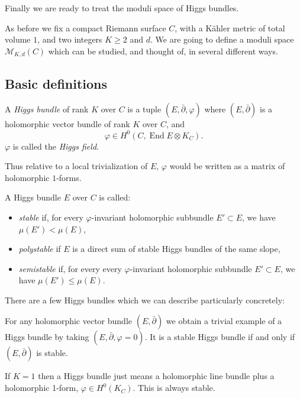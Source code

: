 \documentclass[12pt,letterpaper,reqno]{article}
\numberwithin{equation}{section}
\newcommand{\cM}{\ensuremath{\mathcal M}}
\newcommand{\kahler}{K\"ahler\xspace}
\newcommand{\ti}[1]{\textit{#1}}
\DeclareMathOperator{\End}{End}
\begin{document}
Finally we are ready to treat the moduli space of Higgs bundles.

As before we fix a compact Riemann surface $C$, with a 
\kahler metric of total volume $1$, and two integers
$K \ge 2$ and $d$.
We are going to define a moduli space $\cM_{K,d}(C)$ which can be
studied, and thought of, in several different ways.


\subsection{Basic definitions}

\begin{defn} \label{def:higgs-bundle}
A \ti{Higgs bundle} of rank $K$ over $C$ 
is a tuple $(E, \bar\partial, \varphi)$
where $(E,\bar\partial)$ is a holomorphic vector bundle
of rank $K$ over $C$, and 
\begin{equation}
\varphi \in H^0(C, \End E \otimes K_C).  
\end{equation}
$\varphi$ is called the \ti{Higgs field}.
\end{defn}

Thus relative to a local trivialization of $E$, $\varphi$ would 
be written as a matrix of holomorphic $1$-forms.

\begin{defn} A Higgs bundle $E$ over $C$ is called:
\begin{itemize}
\item \ti{stable} if, for every $\varphi$-invariant 
holomorphic subbundle $E' \subset E$,
we have $\mu(E') < \mu(E)$,
\item \ti{polystable} if $E$ is a direct sum of stable Higgs bundles
of the same slope,
\item \ti{semistable} if, for every every $\varphi$-invariant 
holomorphic subbundle 
$E' \subset E$, we have $\mu(E') \le \mu(E)$.
\end{itemize}
\end{defn}

There are a few Higgs bundles which we can describe particularly
concretely:

\begin{example} For any holomorphic vector
bundle $(E,\bar\partial)$ we obtain a trivial example of a Higgs bundle
by taking $(E,\bar\partial,\varphi=0)$. It is a stable Higgs bundle
if and only if $(E,\bar\partial)$ is stable.
\end{example}

\begin{example} If $K=1$ then a Higgs bundle
just means a holomorphic line bundle plus a holomorphic 1-form,
$\varphi \in H^0(K_C)$. This is always stable.
\end{example}
\end{document}
